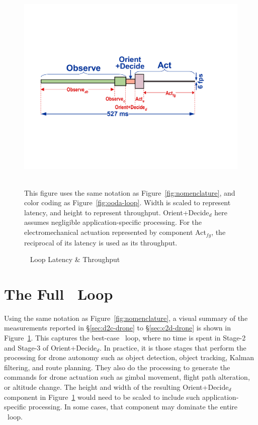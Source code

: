 \begin{figure}
\centering
\includegraphics[width=0.8\linewidth]{chapter5/FIGS/fig-ooda-scaling.pdf}
\begin{captext}
  \\[0.2cm]
  This figure uses the same notation as Figure~\ref{fig:nomenclature},
  and color coding as Figure~\ref{fig:ooda-loop}.  Width is scaled to
  represent latency, and height to represent throughput.
  Orient+Decide$_d$ here assumes negligible application-specific
  processing.  For the electromechanical actuation represented by
  component Act$_{fg}$, the reciprocal of its latency is used as its
  throughput.
\end{captext}
\caption{\ooda~ Loop Latency \& Throughput}
\label{fig:ooda-scaling}
\end{figure}

\section{The Full \ooda~Loop}
\label{sec:e2e-discussion}

Using the same notation as Figure~\ref{fig:nomenclature}, a visual
summary of the measurements reported in \S\ref{sec:d2c-drone} to
\S\ref{sec:c2d-drone} is shown in Figure~\ref{fig:ooda-scaling}.  This
captures the best-case \ooda~loop, where no time is spent in Stage-2
and Stage-3 of Orient+Decide$_d$.  In practice, it is those stages that
perform the processing for drone autonomy such as object detection,
object tracking, Kalman filtering, and route planning.  They also do
the processing to generate the commands for drone actuation such as
gimbal movement, flight path alteration, or altitude change.  The
height and width of the resulting Orient+Decide$_d$ component in
Figure~\ref{fig:ooda-scaling} would need to be scaled to include such
application-specific processing.  In some cases, that component
may dominate the entire \ooda~loop.


